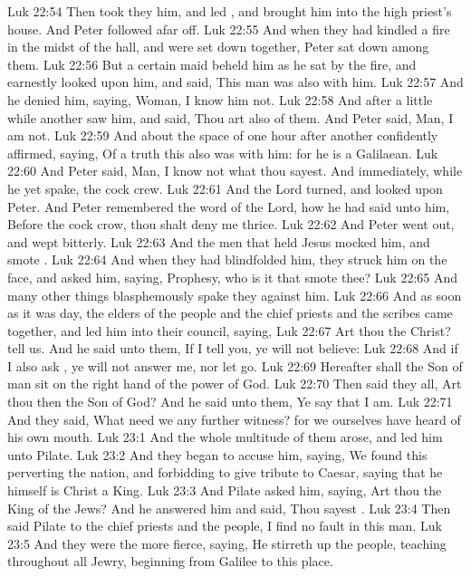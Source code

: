 \vs Luk 22:54 Then took they him, and led , and brought him into the high priest's house. And Peter followed afar off.
\vs Luk 22:55 And when they had kindled a fire in the midst of the hall, and were set down together, Peter sat down among them.
\vs Luk 22:56 But a certain maid beheld him as he sat by the fire, and earnestly looked upon him, and said, This man was also with him.
\vs Luk 22:57 And he denied him, saying, Woman, I know him not.
\vs Luk 22:58 And after a little while another saw him, and said, Thou art also of them. And Peter said, Man, I am not.
\vs Luk 22:59 And about the space of one hour after another confidently affirmed, saying, Of a truth this  also was with him: for he is a Galilaean.
\vs Luk 22:60 And Peter said, Man, I know not what thou sayest. And immediately, while he yet spake, the cock crew.
\vs Luk 22:61 And the Lord turned, and looked upon Peter. And Peter remembered the word of the Lord, how he had said unto him, Before the cock crow, thou shalt deny me thrice.
\vs Luk 22:62 And Peter went out, and wept bitterly.
\vs Luk 22:63 And the men that held Jesus mocked him, and smote .
\vs Luk 22:64 And when they had blindfolded him, they struck him on the face, and asked him, saying, Prophesy, who is it that smote thee?
\vs Luk 22:65 And many other things blasphemously spake they against him.
\vs Luk 22:66 And as soon as it was day, the elders of the people and the chief priests and the scribes came together, and led him into their council, saying,
\vs Luk 22:67 Art thou the Christ? tell us. And he said unto them, If I tell you, ye will not believe:
\vs Luk 22:68 And if I also ask , ye will not answer me, nor let  go.
\vs Luk 22:69 Hereafter shall the Son of man sit on the right hand of the power of God.
\vs Luk 22:70 Then said they all, Art thou then the Son of God? And he said unto them, Ye say that I am.
\vs Luk 22:71 And they said, What need we any further witness? for we ourselves have heard of his own mouth.
\vs Luk 23:1 And the whole multitude of them arose, and led him unto Pilate.
\vs Luk 23:2 And they began to accuse him, saying, We found this  perverting the nation, and forbidding to give tribute to Caesar, saying that he himself is Christ a King.
\vs Luk 23:3 And Pilate asked him, saying, Art thou the King of the Jews? And he answered him and said, Thou sayest .
\vs Luk 23:4 Then said Pilate to the chief priests and  the people, I find no fault in this man.
\vs Luk 23:5 And they were the more fierce, saying, He stirreth up the people, teaching throughout all Jewry, beginning from Galilee to this place.
